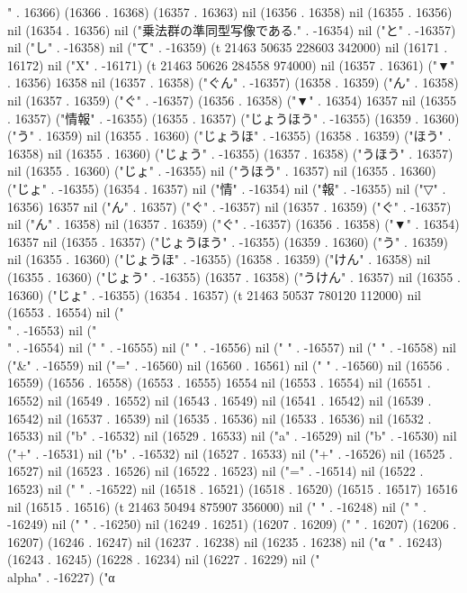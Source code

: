 " . 16366) (16366 . 16368) (16357 . 16363) nil (16356 . 16358) nil (16355 . 16356) nil (16354 . 16356) nil ("乗法群の準同型写像である." . -16354) nil ("と" . -16357) nil ("し" . -16358) nil ("て" . -16359) (t 21463 50635 228603 342000) nil (16171 . 16172) nil ("X" . -16171) (t 21463 50626 284558 974000) nil (16357 . 16361) ("▼" . 16356) 16358 nil (16357 . 16358) ("ぐん" . -16357) (16358 . 16359) ("ん" . 16358) nil (16357 . 16359) ("ぐ" . -16357) (16356 . 16358) ("▼" . 16354) 16357 nil (16355 . 16357) ("情報" . -16355) (16355 . 16357) ("じょうほう" . -16355) (16359 . 16360) ("う" . 16359) nil (16355 . 16360) ("じょうほ" . -16355) (16358 . 16359) ("ほう" . 16358) nil (16355 . 16360) ("じょう" . -16355) (16357 . 16358) ("うほう" . 16357) nil (16355 . 16360) ("じょ" . -16355) nil ("うほう" . 16357) nil (16355 . 16360) ("じょ" . -16355) (16354 . 16357) nil ("情" . -16354) nil ("報" . -16355) nil ("▽" . 16356) 16357 nil ("ん" . 16357) ("ぐ" . -16357) nil (16357 . 16359) ("ぐ" . -16357) nil ("ん" . 16358) nil (16357 . 16359) ("ぐ" . -16357) (16356 . 16358) ("▼" . 16354) 16357 nil (16355 . 16357) ("じょうほう" . -16355) (16359 . 16360) ("う" . 16359) nil (16355 . 16360) ("じょうほ" . -16355) (16358 . 16359) ("けん" . 16358) nil (16355 . 16360) ("じょう" . -16355) (16357 . 16358) ("うけん" . 16357) nil (16355 . 16360) ("じょ" . -16355) (16354 . 16357) (t 21463 50537 780120 112000) nil (16553 . 16554) nil ("\\" . -16553) nil ("\\" . -16554) nil ("
" . -16555) nil (" " . -16556) nil (" " . -16557) nil (" " . -16558) nil ("&" . -16559) nil ("=" . -16560) nil (16560 . 16561) nil (" " . -16560) nil (16556 . 16559) (16556 . 16558) (16553 . 16555) 16554 nil (16553 . 16554) nil (16551 . 16552) nil (16549 . 16552) nil (16543 . 16549) nil (16541 . 16542) nil (16539 . 16542) nil (16537 . 16539) nil (16535 . 16536) nil (16533 . 16536) nil (16532 . 16533) nil ("b" . -16532) nil (16529 . 16533) nil ("a" . -16529) nil ("b" . -16530) nil ("+" . -16531) nil ("b" . -16532) nil (16527 . 16533) nil ("+" . -16526) nil (16525 . 16527) nil (16523 . 16526) nil (16522 . 16523) nil ("=" . -16514) nil (16522 . 16523) nil (" " . -16522) nil (16518 . 16521) (16518 . 16520) (16515 . 16517) 16516 nil (16515 . 16516) (t 21463 50494 875907 356000) nil ("
" . -16248) nil (" " . -16249) nil (" " . -16250) nil (16249 . 16251) (16207 . 16209) (" " . 16207) (16206 . 16207) (16246 . 16247) nil (16237 . 16238) nil (16235 . 16238) nil ("α
" . 16243) (16243 . 16245) (16228 . 16234) nil (16227 . 16229) nil ("\\alpha" . -16227) ("α
